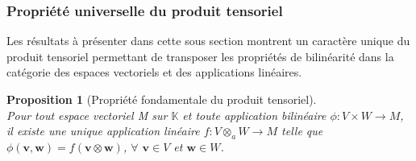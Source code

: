 \documentclass[11pt,a4paper,oneside]{book}
\newtheorem{prop}{Proposition}[chapter]
\def\K{\mathbb K}
\def\v{\mathbf v}
\def\w{\mathbf w}
\begin{document}
\subsubsection{Propriété universelle du produit tensoriel}
Les résultats à présenter dans cette sous section montrent un caractère unique du produit tensoriel permettant de transposer les propriétés de bilinéarité dans la catégorie des espaces vectoriels et des applications linéaires.
\begin{prop}[Propriété fondamentale du produit tensoriel]\label{prop1.3}
\emph{\\}
Pour tout espace vectoriel M sur $ \K $ et toute application bilinéaire $\phi:V\times W\longrightarrow M  $, il existe une unique application linéaire $ f:V\otimes_{a} W \longrightarrow M$ telle que $ \phi(\v,\w)=f(\v\otimes \w) $, $ \forall $ $ \v\in V $ et $ \w\in W $.
\end{prop}
\end{document}
